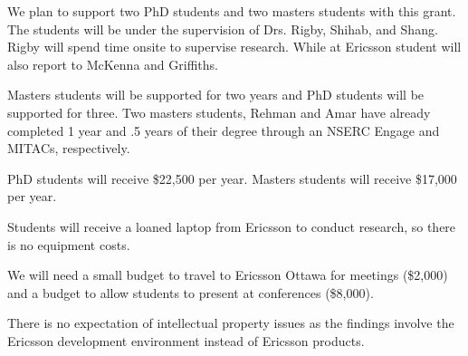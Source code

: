 \documentclass[12pt, letterpaper]{article}
\begin{document}
\fancyhead{}
\pagestyle{fancy}
\renewcommand{\headrulewidth}{0pt}

\begin{center}
\begin{LARGE}
\noindent
{}
\end{LARGE}
\end{center}


We plan to support two PhD students and two masters students with this grant.
The students will be under the supervision of Drs. Rigby, Shihab, and Shang. Rigby will spend time onsite to supervise research. While at Ericsson student will also report to McKenna and Griffiths.

Masters students will be supported for two years and PhD students will be supported for three. Two masters students, Rehman and Amar have already completed 1 year and .5 years of their degree through an NSERC Engage and MITACs, respectively.

PhD students will receive \$22,500 per year. Masters students will receive \$17,000 per year. 

Students will receive a loaned laptop from Ericsson to conduct research, so there is no equipment costs.

We will need a small budget to travel to Ericsson Ottawa for meetings (\$2,000) and a budget to allow students to present at conferences (\$8,000).

There is no expectation of intellectual property issues as the findings involve
the Ericsson development environment instead of Ericsson products.
\end{document}
